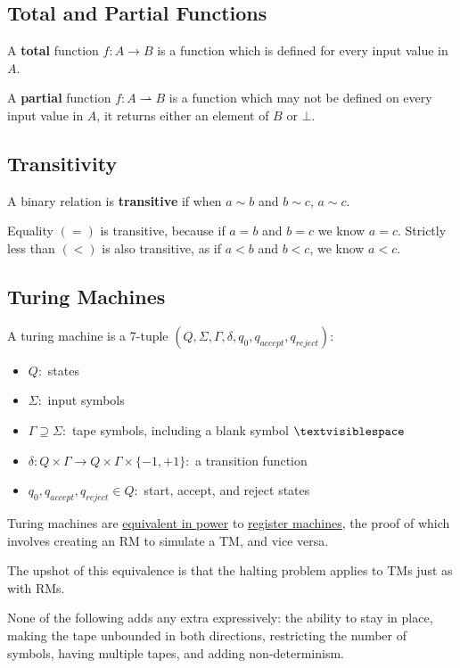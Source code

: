 \documentclass{article}
\begin{document}
\subsection{Total and Partial Functions}\label{total-partial}
A \textbf{total} function $f : A \to B$ is a function which is defined for every input value in $A$.

A \textbf{partial} function $f : A \rightharpoonup B$ is a function which may not be defined on every input value in $A$, it returns either an element of $B$ or $\bot$.


\subsection{Transitivity}\label{transitive}
A binary relation is \textbf{transitive} if when $a \sim b$ and $b \sim c$, $a \sim c$.

Equality $(=)$ is transitive, because if $a = b$ and $b = c$ we know $a = c$. Strictly less than $(<)$ is also transitive, as if $a < b$ and $b < c$, we know $a < c$.


\subsection{Turing Machines}\label{tm}
A turing machine is a 7-tuple $(Q, \Sigma, \Gamma, \delta, q_0, q_{accept}, q_{reject})$:
\begin{itemize}
    \item $Q:$ states
    \item $\Sigma:$ input symbols
    \item $\Gamma \supseteq \Sigma:$ tape symbols, including a blank symbol $\textvisiblespace$
    \item $\delta: Q \times \Gamma \to Q \times \Gamma \times \{-1, +1\}:$ a transition function
    \item $q_0, q_{accept}, q_{reject} \in Q:$ start, accept, and reject states
\end{itemize}

Turing machines are \hyperref[church-turing]{equivalent in power} to \hyperref[rm]{register machines}, the proof of which involves creating an RM to simulate a TM, and vice versa.

The upshot of this equivalence is that the halting problem applies to TMs just as with RMs.

None of the following adds any extra expressively: the ability to stay in place, making the tape unbounded in both directions, restricting the number of symbols, having multiple tapes, and adding non-determinism.
\end{document}
